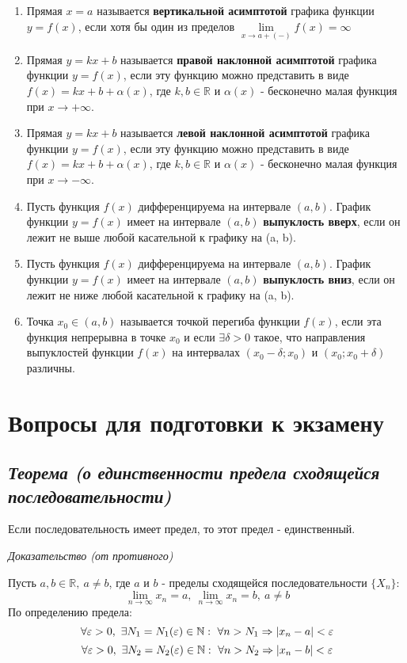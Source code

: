 \begin{enumerate}
\item Прямая $x = a$ называется \textbf{вертикальной асимптотой} графика функции $y = f(x)$, если хотя бы один из пределов $\lim\limits_{x \to a+(-)}f(x) = \infty$
\item Прямая $y = kx + b$ называется \textbf{правой наклонной асимптотой} графика функции $y = f(x)$, если эту функцию можно представить в виде $f(x) = kx + b + \alpha(x)$, где $k, b \in \mathbb{R}$ и $\alpha(x)$ - бесконечно малая функция при $x \rightarrow +\infty$.
\item Прямая $y = kx + b$ называется \textbf{левой наклонной асимптотой} графика функции $y = f(x)$, если эту функцию можно представить в виде $f(x) = kx + b + \alpha(x)$, где $k, b \in \mathbb{R}$ и $\alpha(x)$ - бесконечно малая функция при $x \rightarrow -\infty$.
\item Пусть функция $f(x)$ дифференцируема на интервале $(a, b)$. График функции $y = f(x)$ имеет на интервале $(a, b)$ \textbf{выпуклость вверх}, если он лежит не выше любой касательной к графику на (a, b).
\item Пусть функция $f(x)$ дифференцируема на интервале $(a, b)$. График функции $y = f(x)$ имеет на интервале $(a, b)$ \textbf{выпуклость вниз}, если он лежит не ниже любой касательной к графику на (a, b).
\item Точка $x_0 \in (a,b)$ называется точкой перегиба функции $f(x)$, если эта функция непрерывна в точке $x_0$ и если $\exists \delta > 0$ такое, что направления выпуклостей функции $f(x)$ на интервалах $(x_0-\delta; x_0)$ и $(x_0; x_0+\delta)$ различны.

\end{enumerate}
\newpage 
\section{Вопросы для подготовки к экзамену}
\subsection{\textit{Теорема (о единственности предела сходящейся последовательности)}}

Если последовательность имеет предел, то этот предел - единственный.

\textit{Доказательство (от противного)}

Пусть $a, b \in \mathbb{R}, \ a \neq b$, где $a$ и $b$ - пределы сходящейся последовательности $\{X_n\}$: $$\lim\limits_{n \to \infty} x_n = a,\ \lim\limits_{n \to \infty} x_n = b, \ a \neq b$$ По определению предела: $$\forall {\large\varepsilon} > 0, \ \exists N_1 = N_1({\large\varepsilon}) \in \mathbb{N} : \ \forall n > N_1 \Rightarrow  | x_n - a|  < {\large\varepsilon} $$ $$\forall {\large\varepsilon} > 0, \ \exists N_2 = N_2({\large\varepsilon}) \in \mathbb{N} : \ \forall n > N_2 \Rightarrow  | x_n - b|  < {\large\varepsilon} $$

